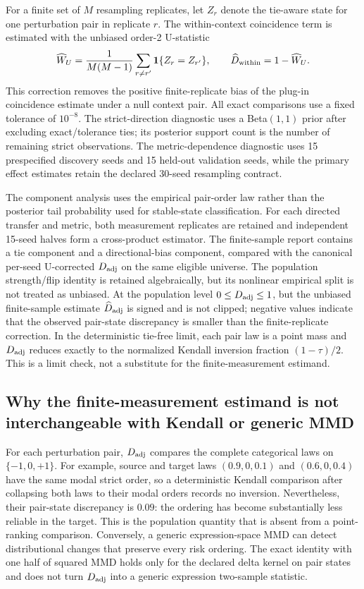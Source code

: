 \documentclass{article}
\begin{document}
For a finite set of $M$ resampling replicates, let $Z_r$ denote the
tie-aware state for one perturbation pair in replicate $r$. The within-context
coincidence term is estimated with the unbiased order-2 U-statistic
\[
 \widehat W_U=\frac{1}{M(M-1)}\sum_{r\ne r'}\mathbf{1}\{Z_r=Z_{r'}\},
 \qquad \widehat D_{\rm within}=1-\widehat W_U.
\]
This correction removes the positive finite-replicate bias of the plug-in
coincidence estimate under a null context pair. All exact comparisons use a
fixed tolerance of $10^{-8}$. The strict-direction diagnostic uses a
Beta$(1,1)$ prior after excluding exact/tolerance ties; its posterior support
count is the number of remaining strict observations. The metric-dependence
diagnostic uses 15 prespecified discovery seeds and 15 held-out validation
seeds, while the primary effect estimates retain the declared 30-seed
resampling contract.

The component analysis uses the empirical pair-order law rather than the
posterior tail probability used for stable-state classification. For each
directed transfer and metric, both measurement replicates are retained and
independent 15-seed halves form a cross-product estimator. The finite-sample
report contains a tie component and a directional-bias component, compared
with the canonical per-seed U-corrected $D_{\rm adj}$ on the same eligible
universe. The population strength/flip identity is retained algebraically,
but its nonlinear empirical split is not treated as unbiased. At the
population level $0\leq D_{\rm adj}\leq 1$, but the unbiased
  finite-sample estimate $\widehat D_{\rm adj}$ is signed and is not clipped;
negative values indicate that the observed pair-state discrepancy is smaller
than the finite-replicate correction. In the deterministic tie-free limit,
each pair law is a point mass and $D_{\rm adj}$ reduces exactly to the
normalized Kendall inversion fraction $(1-\tau)/2$. This is a limit check,
not a substitute for the finite-measurement estimand.

\subsection{Why the finite-measurement estimand is not interchangeable with Kendall or generic MMD}
For each perturbation pair, $D_{\rm adj}$ compares the complete categorical
laws on $\{-1,0,+1\}$. For example, source and target laws
$(0.9,0,0.1)$ and $(0.6,0,0.4)$ have the same modal strict order, so a
deterministic Kendall comparison after collapsing both laws to their modal orders records no
inversion. Nevertheless, their pair-state discrepancy is $0.09$: the ordering
has become substantially less reliable in the target. This is the population
quantity that is absent from a point-ranking comparison. Conversely, a
generic expression-space MMD can detect distributional changes that preserve
every risk ordering. The exact identity with one half of squared MMD holds
only for the declared delta kernel on pair states and does not turn
$D_{\rm adj}$ into a generic expression two-sample statistic.
\end{document}

